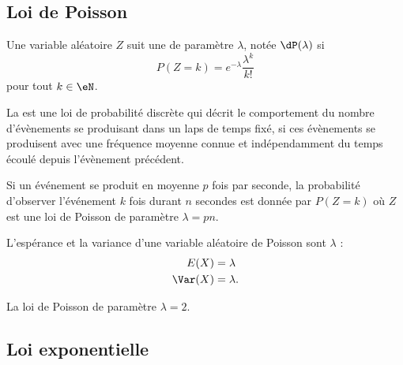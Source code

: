 \subsection{Loi de Poisson}


Une variable aléatoire \( Z\) suit une  de paramètre \( \lambda\), notée \( \dP(\lambda)\) si
\begin{equation}
    P(Z=k)= e^{-\lambda}\frac{ \lambda^k }{ k! }
\end{equation}
pour tout \( k\in\eN\).

La  est une loi de probabilité discrète qui décrit le comportement du nombre d'évènements se produisant dans un laps de temps fixé, si ces évènements se produisent avec une fréquence moyenne connue et indépendamment du temps écoulé depuis l'évènement précédent. 

Si un événement se produit en moyenne \( p\) fois par seconde, la probabilité d'observer l'événement \( k\) fois durant \( n\) secondes est donnée par \( P(Z=k)\) où \( Z\) est une loi de Poisson de paramètre \( \lambda=pn\).

\begin{theorem}      \label{ThojDZjuj}
    L'espérance et la variance d'une variable aléatoire de Poisson sont \( \lambda\) :
    \begin{subequations}
        \begin{align}
            E(X)&=\lambda\\
            \Var(X)&=\lambda.
        \end{align}
    \end{subequations}
\end{theorem}

La loi de Poisson de paramètre \( \lambda=2\).

\begin{center}
   
\end{center}

\subsection{Loi exponentielle}

